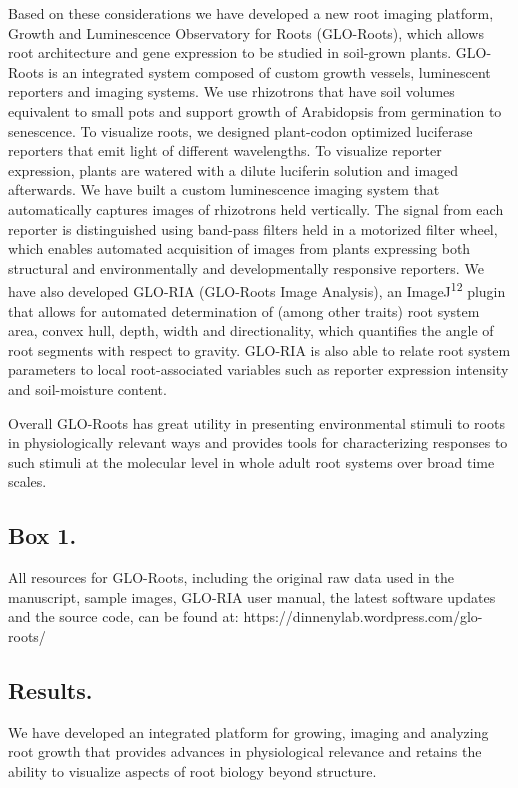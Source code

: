 \documentclass[]{article}
\begin{document}
Based on these considerations we have developed a new root imaging
platform, Growth and Luminescence Observatory for Roots (GLO-Roots),
which allows root architecture and gene expression to be studied in
soil-grown plants. GLO-Roots is an integrated system composed of custom
growth vessels, luminescent reporters and imaging systems. We use
rhizotrons that have soil volumes equivalent to small pots and support
growth of Arabidopsis from germination to senescence. To visualize
roots, we designed plant-codon optimized luciferase reporters that emit
light of different wavelengths. To visualize reporter expression, plants
are watered with a dilute luciferin solution and imaged afterwards. We
have built a custom luminescence imaging system that automatically
captures images of rhizotrons held vertically. The signal from each
reporter is distinguished using band-pass filters held in a motorized
filter wheel, which enables automated acquisition of images from plants
expressing both structural and environmentally and developmentally
responsive reporters. We have also developed GLO-RIA (GLO-Roots Image
Analysis), an ImageJ\textsuperscript{12} plugin that allows for
automated determination of (among other traits) root system area, convex
hull, depth, width and directionality, which quantifies the angle of
root segments with respect to gravity. GLO-RIA is also able to relate
root system parameters to local root-associated variables such as
reporter expression intensity and soil-moisture content.

Overall GLO-Roots has great utility in presenting environmental stimuli
to roots in physiologically relevant ways and provides tools for
characterizing responses to such stimuli at the molecular level in whole
adult root systems over broad time scales.

\subsection{Box 1.}\label{box-1.}

All resources for GLO-Roots, including the original raw data used in the
manuscript, sample images, GLO-RIA user manual, the latest software
updates and the source code, can be found at:
https://dinnenylab.wordpress.com/glo-roots/

\subsection{Results.}\label{results.}

We have developed an integrated platform for growing, imaging and
analyzing root growth that provides advances in physiological relevance
and retains the ability to visualize aspects of root biology beyond
structure.
\end{document}
